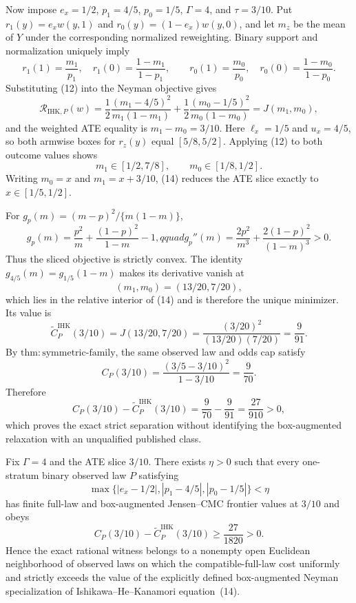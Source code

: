 Now impose \(e_x=1/2\), \(p_1=4/5\), \(p_0=1/5\), \(\Gamma=4\), and \(\tau=3/10\).  Put \(r_1(y)=e_xw(y,1)\) and \(r_0(y)=(1-e_x)w(y,0)\), and let \(m_z\) be the mean of \(Y\) under the corresponding normalized reweighting.  Binary support and normalization uniquely imply
\[
 r_1(1)=\frac{m_1}{p_1},\quad r_1(0)=\frac{1-m_1}{1-p_1},\qquad
 r_0(1)=\frac{m_0}{p_0},\quad r_0(0)=\frac{1-m_0}{1-p_0}. \tag{12}
\]
Substituting (12) into the Neyman objective gives
\[
 \mathscr R_{\mathrm{IHK},P}(w)
 =\frac12\frac{(m_1-4/5)^2}{m_1(1-m_1)}
 +\frac12\frac{(m_0-1/5)^2}{m_0(1-m_0)}
 =J(m_1,m_0), \tag{13}
\]
and the weighted ATE equality is \(m_1-m_0=3/10\).  Here \(\ell_x=1/5\) and \(u_x=4/5\), so both armwise boxes for \(r_z(y)\) equal \([5/8,5/2]\).  Applying (12) to both outcome values shows
\[
 m_1\in[1/2,7/8],\qquad m_0\in[1/8,1/2]. \tag{14}
\]
Writing \(m_0=x\) and \(m_1=x+3/10\), (14) reduces the ATE slice exactly to \(x\in[1/5,1/2]\).

For \(g_p(m)=(m-p)^2/\{m(1-m)\}\),
\[
 g_p(m)=\frac{p^2}{m}+\frac{(1-p)^2}{1-m}-1,qquad
 g_p''(m)=\frac{2p^2}{m^3}+\frac{2(1-p)^2}{(1-m)^3}>0. \tag{15}
\]
Thus the sliced objective is strictly convex.  The identity \(g_{4/5}(m)=g_{1/5}(1-m)\) makes its derivative vanish at
\[
 (m_1,m_0)=(13/20,7/20), \tag{16}
\]
which lies in the relative interior of (14) and is therefore the unique minimizer.  Its value is
\[
 \widetilde C^{\mathrm{IHK}}_P(3/10)
 =J(13/20,7/20)
 =\frac{(3/20)^2}{(13/20)(7/20)}=\frac{9}{91}. \tag{17}
\]
By \(\mathrm{thm{:}symmetric\mbox{-}family}\), the same observed law and odds cap satisfy
\[
 C_P(3/10)=\frac{(3/5-3/10)^2}{1-3/10}=\frac{9}{70}. \tag{18}
\]
Therefore
\[
 C_P(3/10)-\widetilde C^{\mathrm{IHK}}_P(3/10)
 =\frac{9}{70}-\frac{9}{91}=\frac{27}{910}>0, \tag{19}
\]
which proves the exact strict separation without identifying the box-augmented relaxation with an unqualified published class.

Fix \(\Gamma=4\) and the ATE slice \(3/10\).  There exists \(\eta>0\) such that every one-stratum binary observed law \(P\) satisfying
\[
 \max\{|e_x-1/2|,|p_1-4/5|,|p_0-1/5|\}<\eta
\]
has finite full-law and box-augmented Jensen--CMC frontier values at \(3/10\) and obeys
\[
 C_P(3/10)-\widetilde C^{\mathrm{IHK}}_P(3/10)\geq\frac{27}{1820}>0.
\]
Hence the exact rational witness belongs to a nonempty open Euclidean neighborhood of observed laws on which the compatible-full-law cost uniformly and strictly exceeds the value of the explicitly defined box-augmented Neyman specialization of Ishikawa--He--Kanamori equation~(14).

